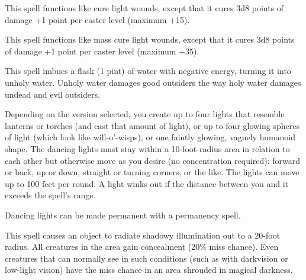 \begin{multicols}{2}
\begin{small}
\noindent This spell functions like cure light wounds, except that it cures 3d8 points of damage +1 point per caster level (maximum +15).

\noindent This spell functions like mass cure light wounds, except that it cures 3d8 points of damage +1 point per caster level (maximum +35).

\noindent This spell imbues a flask (1 pint) of water with negative energy, turning it into unholy water. Unholy water damages good outsiders the way holy water damages undead and evil outsiders.


\noindent Depending on the version selected, you create up to four lights that resemble lanterns or torches (and cast that amount of light), or up to four glowing spheres of light (which look like will-o'-wisps), or one faintly glowing, vaguely humanoid shape. The dancing lights must stay within a 10-foot-radius area in relation to each other but otherwise move as you desire (no concentration required): forward or back, up or down, straight or turning corners, or the like. The lights can move up to 100 feet per round. A light winks out if the distance between you and it exceeds the spell's range.

\smallskip\noindent Dancing lights can be made permanent with a permanency spell.

\noindent This spell causes an object to radiate shadowy illumination out to a 20-foot radius. All creatures in the area gain concealment (20\% miss chance). Even creatures that can normally see in such conditions (such as with darkvision or low-light vision) have the miss chance in an area shrouded in magical darkness.


\end{small}
\end{multicols}
